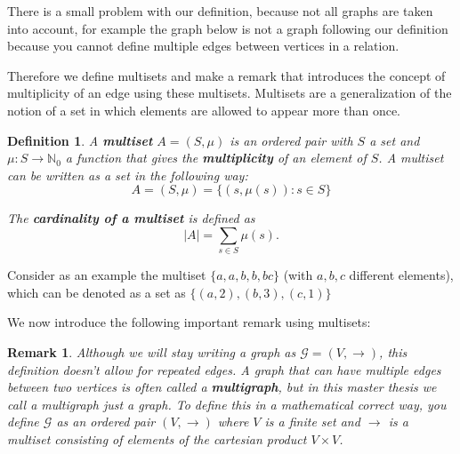 \documentclass[a4paper,11pt]{report}
\newtheorem{definition}[theorem]{Definition}
\newtheorem{remark}[theorem]{Remark}
\newcommand{\N}{{\mathbb N}}
\newcommand{\graf}{\mathscr{G}}
\begin{document}
There is a small problem with our definition, because not all graphs are taken 
into account, for example the  graph below is not a graph following our definition 
because you cannot define multiple edges between vertices in a relation. 

  \begin{center}
\end{center}




Therefore we define multisets and make a remark that introduces the concept of 
multiplicity of an edge using these multisets. Multisets are a generalization of 
the notion of a set in which elements are allowed to appear more than once.

\begin{definition}\label{multiset}
  A \textbf{multiset} $A=(S,\mu)$ is an ordered pair with $S$ a set and $\mu: S \to 
  \N_{0}$ a function that gives the \textbf{multiplicity} of an element of $S$. A 
  multiset can be written as a set in the following way:
  $$A = (S, \mu) = \{(s,\mu(s)): s \in S\}$$
  
  The \textbf{cardinality of a multiset} is defined as 
  $$|A| = \sum_{s \in S} \mu(s).$$
  \end{definition}
 Consider as an example the multiset $\{a, a, b, b, b c\}$ (with $a, b, c$ 
 different elements), which can be denoted as a set as $\{(a, 2), (b,3), (c,1)\}$
  


We now introduce the following important remark using multisets:
\begin{remark}
  Although we will stay writing a graph as $\graf = (V,\to)$, this definition doesn't allow
  for repeated edges. A graph that can have multiple edges between two vertices 
  is often called a \textbf{multigraph}, but in this master thesis we call a 
  multigraph just a graph. To define this in a mathematical correct way, you define 
$\graf$ as an ordered pair $(V, \to)$ where $V$ is a finite set and $\to$ is a multiset consisting of elements of the cartesian product $V \times V$.
\end{remark}
\end{document}
